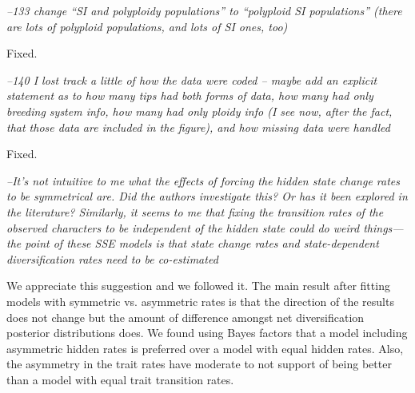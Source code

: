 \documentclass[11pt]{article}
\renewenvironment{quote}{\bigskip\noindent\itshape\ignorespaces}{\smallskip}
\begin{document}

\begin{quote}
--133 change ``SI and polyploidy populations'' to ``polyploid SI populations'' (there are lots of polyploid populations, and lots of SI ones, too)
\end{quote}

Fixed.

\begin{quote}
--140 I lost track a little of how the data were coded -- maybe add an explicit statement as to how many tips had both forms of data, how many had only breeding system info, how many had only ploidy info (I see now, after the fact, that those data are included in the figure), and how missing data were handled
\end{quote}

Fixed.

\begin{quote}
--It's not intuitive to me what the effects of forcing the hidden state change rates to be symmetrical are.
Did the authors investigate this?
Or has it been explored in the literature?
Similarly, it seems to me that fixing the transition rates of the observed characters to be independent of the hidden state could do weird things---the point of these SSE models is that state change rates and state-dependent diversification rates need to be co-estimated
\end{quote}

We appreciate this suggestion and we followed it. The main result after fitting models with symmetric vs. asymmetric rates is that the direction  of the results does not change but the amount of difference amongst net diversification posterior distributions does. We found using Bayes factors that a model including asymmetric hidden rates is preferred over a model with equal hidden rates. Also,  the asymmetry in the trait rates have moderate to not support of being better than a model with equal trait transition rates.  %
\end{document}
